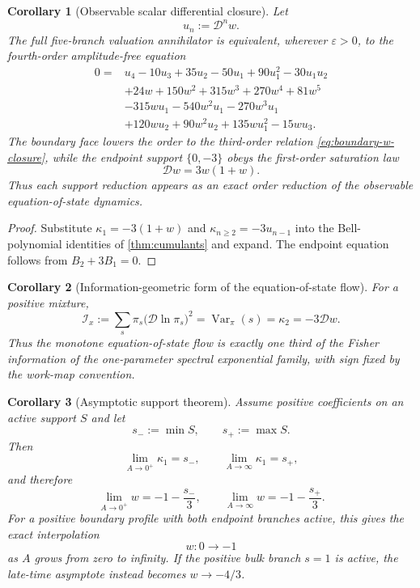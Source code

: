 \documentclass[aps,prd,reprint,onecolumn,nofootinbib,superscriptaddress,showkeys]{revtex4-2}
\numberwithin{equation}{section}
\theoremstyle{definition}
\theoremstyle{plain}
\newtheorem{corollary}{Corollary}[section]
\newcommand{\Dil}{\mathscr D}
\begin{document}
\begin{corollary}[Observable scalar differential closure]\label{cor:w-only-closure}
Let
\[
u_n:=\Dil^n w.
\]
The full five-branch valuation annihilator is equivalent, wherever $\varepsilon>0$, to the fourth-order amplitude-free equation
\begin{equation}
\boxed{
\begin{aligned}
0={}&u_4-10u_3+35u_2-50u_1+90u_1^2-30u_1u_2\\
&+24w+150w^2+315w^3+270w^4+81w^5\\
&-315wu_1-540w^2u_1-270w^3u_1\\
&+120wu_2+90w^2u_2+135wu_1^2-15wu_3.
\end{aligned}}
\end{equation}
The boundary face lowers the order to the third-order relation \cref{eq:boundary-w-closure}, while the endpoint support $\{0,-3\}$ obeys the first-order saturation law
\begin{equation}
\boxed{\Dil w=3w(1+w).}
\end{equation}
Thus each support reduction appears as an exact order reduction of the observable equation-of-state dynamics.
\end{corollary}

\begin{proof}
Substitute $\kappa_1=-3(1+w)$ and $\kappa_{n\ge2}=-3u_{n-1}$ into the Bell-polynomial identities of \cref{thm:cumulants} and expand.  The endpoint equation follows from $B_2+3B_1=0$.
\end{proof}

\begin{corollary}[Information-geometric form of the equation-of-state flow]
For a positive mixture,
\begin{equation}
\boxed{
\mathcal I_x
:=\sum_s\pi_s\bigl(\Dil\ln\pi_s\bigr)^2
=\operatorname{Var}_\pi(s)
=\kappa_2
=-3\Dil w.
}
\end{equation}
Thus the monotone equation-of-state flow is exactly one third of the Fisher information of the one-parameter spectral exponential family, with sign fixed by the work-map convention.
\end{corollary}

\begin{corollary}[Asymptotic support theorem]
Assume positive coefficients on an active support $S$ and let
\[
s_-:=\min S,
\qquad
s_+:=\max S.
\]
Then
\begin{equation}
\lim_{A\to0^+}\kappa_1=s_-,
\qquad
\lim_{A\to\infty}\kappa_1=s_+,
\end{equation}
and therefore
\begin{equation}
\lim_{A\to0^+}w=-1-\frac{s_-}{3},
\qquad
\lim_{A\to\infty}w=-1-\frac{s_+}{3}.
\end{equation}
For a positive boundary profile with both endpoint branches active, this gives the exact interpolation
\begin{equation}
w:0\longrightarrow -1
\end{equation}
as $A$ grows from zero to infinity.  If the positive bulk branch $s=1$ is active, the late-time asymptote instead becomes $w\to-4/3$.
\end{corollary}
\end{document}

